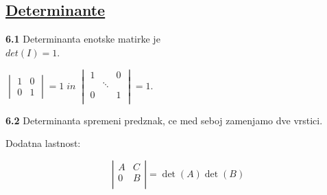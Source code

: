 \documentclass{article}
\begin{document}
\begin{multicols}{2}
\section{\underline{Determinante}}

\textbf{6.1} Determinanta enotske matirke je\\ $det(I) = 1$.
\begin{center}
    \begin{math}
        \begin{vmatrix}
            1 & 0\\
            0 & 1
        \end{vmatrix}
        = 1\; in\;
        \begin{vmatrix}
            1 & & 0\\
            & \ddots &\\
            0 & & 1\\
        \end{vmatrix}
        = 1.
    \end{math}
\end{center}

\textbf{6.2} Determinanta spremeni predznak, ce med seboj zamenjamo dve vrstici.

Dodatna lastnost:

\[
    \left| \begin{array}{cc}
A & C \\
0 & B \\
\end{array} \right| = \det(A) \det(B)
\]


\end{multicols}
\end{document}

